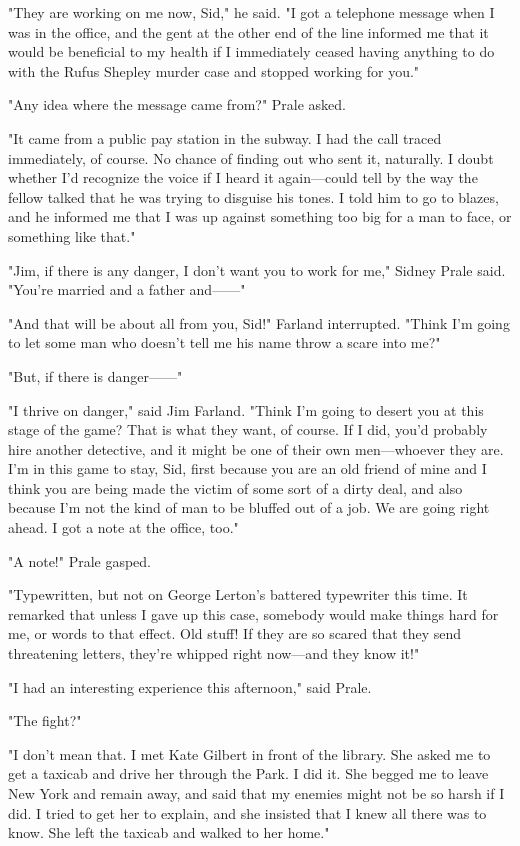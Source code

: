 \documentclass{novel}
\begin{document}
"They are working on me now, Sid," he said. "I got a telephone message when I was in the office, and the gent at the other end of the line informed me that it would be beneficial to my health if I immediately ceased having anything to do with the Rufus Shepley murder case and stopped working for you."

"Any idea where the message came from?" Prale asked.

"It came from a public pay station in the subway. I had the call traced immediately, of course. No chance of finding out who sent it, naturally. I doubt whether I'd recognize the voice if I heard it again---could tell by the way the fellow talked that he was trying to disguise his tones. I told him to go to blazes, and he informed me that I was up against something too big for a man to face, or something like that."

"Jim, if there is any danger, I don't want you to work for me," Sidney Prale said. "You're married and a father and------"

"And that will be about all from you, Sid!" Farland interrupted. "Think I'm going to let some man who doesn't tell me his name throw a scare into me?"

"But, if there is danger------"

"I thrive on danger," said Jim Farland. "Think I'm going to desert you at this stage of the game? That is what they want, of course. If I did, you'd probably hire another detective, and it might be one of their own men---whoever they are. I'm in this game to stay, Sid, first because you are an old friend of mine and I think you are being made the victim of some sort of a dirty deal, and also because I'm not the kind of man to be bluffed out of a job. We are going right ahead. I got a note at the office, too."

"A note!" Prale gasped.

"Typewritten, but not on George Lerton's battered typewriter this time. It remarked that unless I gave up this case, somebody would make things hard for me, or words to that effect. Old stuff! If they are so scared that they send threatening letters, they're whipped right now---and they know it!"

"I had an interesting experience this afternoon," said Prale.

"The fight?"

"I don't mean that. I met Kate Gilbert in front of the library. She asked me to get a taxicab and drive her through the Park. I did it. She begged me to leave New York and remain away, and said that my enemies might not be so harsh if I did. I tried to get her to explain, and she insisted that I knew all there was to know. She left the taxicab and walked to her home."
\end{document}
